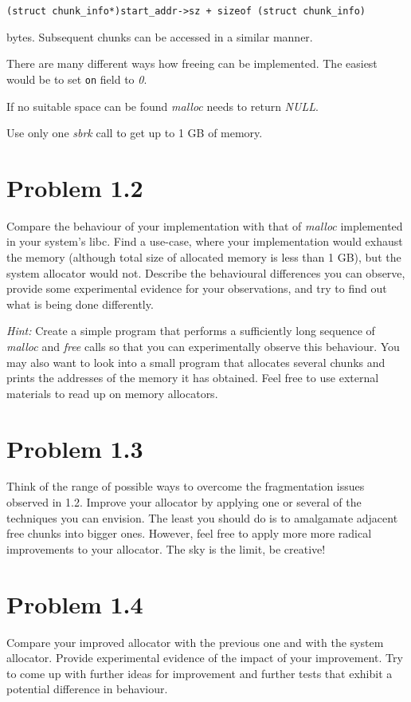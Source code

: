 \documentclass[a4paper,10pt]{scrartcl}
\begin{document}
\begin{description}
        \verb|(struct chunk_info*)start_addr->sz + sizeof (struct chunk_info)|
        
        bytes.  Subsequent chunks can be accessed in a similar manner.

        There are many different ways how freeing can be implemented.
        The easiest would be to
        set \verb|on| field to \textit{0}.

        If no suitable space can be found \textit{malloc} needs to return
        \textit{NULL}.

    \end{description}

    Use only one \textit{sbrk} call to get up to 1 GB of memory.


    \section{Problem 1.2}
    Compare the behaviour of your implementation with that of 
    \textit{malloc } implemented in
    your system's libc.  Find a use-case, where your implementation would
    exhaust the memory (although total size of allocated memory is less
    than 1 GB), but the system allocator would not.
    Describe the behavioural differences you can observe, provide
    some experimental evidence for your observations, and try to find out
    what is being done differently. 

    \textsl{Hint:}
    Create a simple program that performs a sufficiently long sequence of
    \textit{malloc} and \textit{free} calls so that you can experimentally observe
    this behaviour. You may also want to look into a small program that allocates
    several chunks and prints the addresses of the memory it has obtained.
    Feel free to use external materials to read up on memory allocators.
    

    \section{Problem 1.3}
    Think of the range of possible ways to overcome the fragmentation issues
    observed in 1.2.
    Improve your allocator by applying one or several of the techniques
    you can envision.
    The least you should do is to amalgamate adjacent free chunks into bigger ones.
    However, feel free to apply more more radical improvements to your allocator.
    The sky is the limit, be creative!
    
    \section{Problem 1.4}
    Compare your improved allocator with the previous one and with the 
    system allocator. Provide experimental evidence of the impact of your
    improvement. Try to come up with further ideas for improvement and
    further tests that exhibit a potential difference in behaviour.
\end{document}
